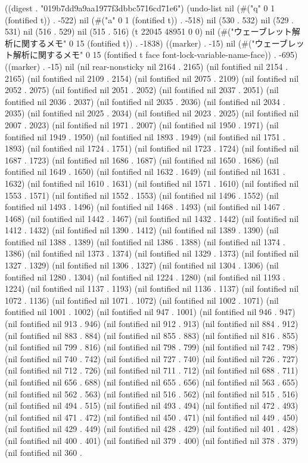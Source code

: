 
((digest . "019b7dd9a9aa1977f3dbbc5716cd71e6") (undo-list nil (#("q" 0 1 (fontified t)) . -522) nil (#("a" 0 1 (fontified t)) . -518) nil (530 . 532) nil (529 . 531) nil (516 . 529) nil (515 . 516) (t 22045 48951 0 0) nil (#("ウェーブレット解析に関するメモ" 0 15 (fontified t)) . -1838) ((marker) . -15) nil (#("ウェーブレット解析に関するメモ" 0 15 (fontified t face font-lock-variable-name-face)) . -695) ((marker) . -15) nil (nil rear-nonsticky nil 2164 . 2165) (nil fontified nil 2154 . 2165) (nil fontified nil 2109 . 2154) (nil fontified nil 2075 . 2109) (nil fontified nil 2052 . 2075) (nil fontified nil 2051 . 2052) (nil fontified nil 2037 . 2051) (nil fontified nil 2036 . 2037) (nil fontified nil 2035 . 2036) (nil fontified nil 2034 . 2035) (nil fontified nil 2025 . 2034) (nil fontified nil 2023 . 2025) (nil fontified nil 2007 . 2023) (nil fontified nil 1971 . 2007) (nil fontified nil 1950 . 1971) (nil fontified nil 1949 . 1950) (nil fontified nil 1893 . 1949) (nil fontified nil 1751 . 1893) (nil fontified nil 1724 . 1751) (nil fontified nil 1723 . 1724) (nil fontified nil 1687 . 1723) (nil fontified nil 1686 . 1687) (nil fontified nil 1650 . 1686) (nil fontified nil 1649 . 1650) (nil fontified nil 1632 . 1649) (nil fontified nil 1631 . 1632) (nil fontified nil 1610 . 1631) (nil fontified nil 1571 . 1610) (nil fontified nil 1553 . 1571) (nil fontified nil 1552 . 1553) (nil fontified nil 1496 . 1552) (nil fontified nil 1493 . 1496) (nil fontified nil 1468 . 1493) (nil fontified nil 1467 . 1468) (nil fontified nil 1442 . 1467) (nil fontified nil 1432 . 1442) (nil fontified nil 1412 . 1432) (nil fontified nil 1390 . 1412) (nil fontified nil 1389 . 1390) (nil fontified nil 1388 . 1389) (nil fontified nil 1386 . 1388) (nil fontified nil 1374 . 1386) (nil fontified nil 1373 . 1374) (nil fontified nil 1329 . 1373) (nil fontified nil 1327 . 1329) (nil fontified nil 1306 . 1327) (nil fontified nil 1304 . 1306) (nil fontified nil 1280 . 1304) (nil fontified nil 1224 . 1280) (nil fontified nil 1193 . 1224) (nil fontified nil 1137 . 1193) (nil fontified nil 1136 . 1137) (nil fontified nil 1072 . 1136) (nil fontified nil 1071 . 1072) (nil fontified nil 1002 . 1071) (nil fontified nil 1001 . 1002) (nil fontified nil 947 . 1001) (nil fontified nil 946 . 947) (nil fontified nil 913 . 946) (nil fontified nil 912 . 913) (nil fontified nil 884 . 912) (nil fontified nil 883 . 884) (nil fontified nil 855 . 883) (nil fontified nil 816 . 855) (nil fontified nil 799 . 816) (nil fontified nil 798 . 799) (nil fontified nil 742 . 798) (nil fontified nil 740 . 742) (nil fontified nil 727 . 740) (nil fontified nil 726 . 727) (nil fontified nil 712 . 726) (nil fontified nil 711 . 712) (nil fontified nil 688 . 711) (nil fontified nil 656 . 688) (nil fontified nil 655 . 656) (nil fontified nil 563 . 655) (nil fontified nil 562 . 563) (nil fontified nil 516 . 562) (nil fontified nil 515 . 516) (nil fontified nil 494 . 515) (nil fontified nil 493 . 494) (nil fontified nil 472 . 493) (nil fontified nil 471 . 472) (nil fontified nil 450 . 471) (nil fontified nil 449 . 450) (nil fontified nil 429 . 449) (nil fontified nil 428 . 429) (nil fontified nil 401 . 428) (nil fontified nil 400 . 401) (nil fontified nil 379 . 400) (nil fontified nil 378 . 379) (nil fontified nil 360 . 